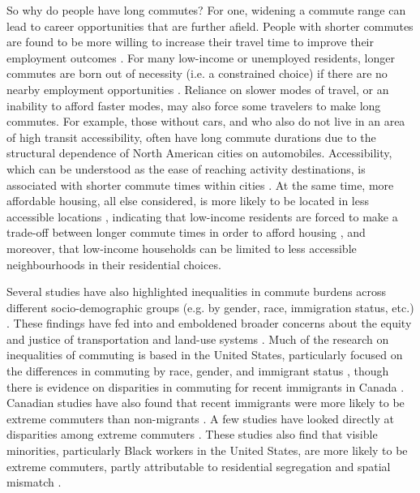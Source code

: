 \documentclass[10 pt,letterpaper]{article}
\begin{document}
So why do people have long commutes? For one, widening a commute range can lead to career opportunities that are further afield. People with shorter commutes are found to be more willing to increase their travel time to improve their employment outcomes \cite{huang_tracking_2018}. For many low-income or unemployed residents, longer commutes are born out of necessity (i.e. a constrained choice) if there are no nearby employment opportunities \cite{marion_comparison_2007,vincent-geslin_determinants_2016}. Reliance on slower modes of travel, or an inability to afford faster modes, may also force some travelers to make long commutes. For example, those without cars, and who also do not live in an area of high transit accessibility, often have long commute durations due to the structural dependence of North American cities on automobiles. Accessibility, which can be understood as the ease of reaching activity destinations, is associated with shorter commute times within cities \cite{levinson_accessibility_1998,hu_changing_2015,cui_accessibility_2019}. At the same time, more affordable housing, all else considered, is more likely to be located in less accessible locations \cite{heyman_how_2019}, indicating that low-income residents are forced to make a trade-off between longer commute times in order to afford housing \cite{palm_trade-offs_2014}, and moreover, that low-income households can be limited to less accessible neighbourhoods in their residential choices.

Several studies have also highlighted inequalities in commute burdens across different socio-demographic groups (e.g. by gender, race, immigration status, etc.) \cite{marion_comparison_2007,preston_revisiting_2016,newbold_immigrant_2017,mclafferty_who_2019,cui_accessibility_2019,bai_exploring_2020,harun_immigrant_2021}. These findings have fed into and emboldened broader concerns about the equity and justice of transportation and land-use systems \cite{martens_transport_2016,banister_inequality_2018,sheller2018mobility}. Much of the research on inequalities of commuting is based in the United States, particularly focused on the differences in commuting by race, gender, and immigrant status \cite{holzer_spatial_1991,liu_immigrant_2012,preston_revisiting_2016,mclafferty_who_2019}, though there is evidence on disparities in commuting for recent immigrants in Canada \cite{Axisa_2012}. Canadian studies have also found that recent immigrants were more likely to be extreme commuters than non-migrants \cite{maoh_determinants_2012-1,government_of_canada_daily_2019}.    A few studies have looked directly at disparities among extreme commuters \cite{marion_comparison_2007,maoh_determinants_2012-1,vincent-geslin_determinants_2016,government_of_canada_daily_2019,bai_exploring_2020}. These studies also find that visible minorities, particularly Black workers in the United States, are more likely to be extreme commuters, partly attributable to residential segregation and spatial mismatch \cite{marion_comparison_2007}. 
\end{document}
